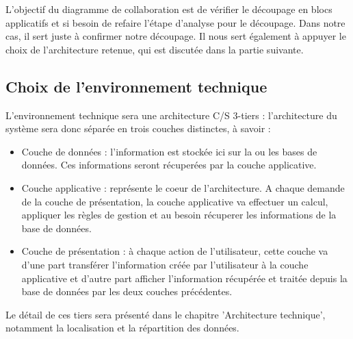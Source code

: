 L'objectif du diagramme de collaboration est de vérifier le découpage en blocs applicatifs et si besoin de refaire l'étape d'analyse pour le découpage. Dans notre cas, il sert juste à confirmer notre découpage. Il nous sert également à appuyer le choix de l'architecture retenue, qui est discutée dans la partie suivante.


\subsection{Choix de l'environnement technique}
L'environnement technique sera une architecture C/S 3-tiers : l'architecture du système sera donc séparée en trois couches distinctes, à savoir :
\begin{itemize}
\item Couche de données : l'information est stockée ici sur la ou les bases de données. Ces informations seront récuperées par la couche applicative.
\item Couche applicative : représente le coeur de l'architecture. A chaque demande de la couche de présentation, la couche applicative va effectuer un calcul, appliquer les règles de gestion et au besoin récuperer les informations de la base de données.
\item Couche de présentation : à chaque action de l'utilisateur, cette couche va d'une part transférer l'information créée par l'utilisateur à la couche applicative et d'autre part afficher l'information récupérée et traitée depuis la base de données par les deux couches précédentes.
\end{itemize}
Le détail de ces tiers sera présenté dans le chapitre 'Architecture technique', notamment la localisation et la répartition des données.
